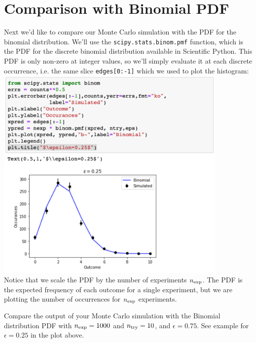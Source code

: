 \section{Comparison with Binomial PDF}

 Next we'd like to compare our Monte Carlo simulation with the PDF for
the binomial distribution.  We'll use the {\tt scipy.stats.binom.pmf}
function, which is the PDF for the discrete binomial distribution
available in Scientific Python.  This PDF is only non-zero at integer
values, so we'll simply evaluate it at each discrete occurrence,
i.e. the same slice {\tt edges[0:-1]} which we used to plot the
histogram:\\
\includegraphics[width=0.85\textwidth]{figs/labs/distributions/compare.png}
\\ Notice that we scale the PDF by the number of experiments $n_{\rm
  exp}$.  The PDF is the expected frequency of each outcome for a
single experiment, but we are plotting the number of occurrences for
$n_{\rm exp}$ experiments.

\begin{plot} Compare the output of your Monte Carlo simulation
with the Binomial distribution PDF with $n_{\rm exp} = 1000$ and
$n_{\rm try} = 10$, and $\epsilon = 0.75$. See example for $\epsilon = 0.25$ in the plot above.
\end{plot}



























